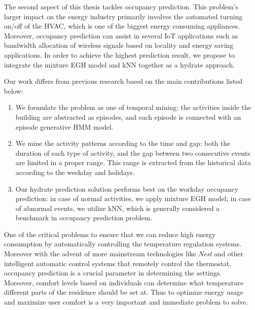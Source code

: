 The second aspect of this thesis tackles occupancy prediction. This problem's larger impact on the energy industry primarily involves the automated turning on/off of the HVAC, which is one of the biggest energy consuming appliances. Moreover, occupancy prediction can assist in several IoT applications such as bandwidth allocation of wireless signals based on locality and energy saving applications.
In order to achieve the highest prediction result, 
we propose to integrate the mixture EGH model and 
kNN together as a hydrate approach.

Our work differs from previous research based on the main contributions listed below:
\begin{enumerate}
\item We formulate the problem as one of temporal mining: the activities inside the building are abstracted as episodes, and each episode is connected with an episode generative HMM model.
\item We mine the activity patterns according to the time and gap: both the duration of each type of 
activity, and the gap between two consecutive events are limited in a proper range. 
This range is extracted from the historical data according to the weekday and holidays.
\item Our hydrate prediction solution performs best on the workday occupancy prediction: 
in case of normal activities, we apply mixture EGH model; 
in case of abnormal events, we utilize kNN,  
which is generally considered a benchmark in occupancy prediction problem. 
\end{enumerate}

One of the critical problems to ensure that we can reduce high energy consumption by automatically controlling the temperature regulation systems. Moreover with the advent of more mainstream technologies like \emph{Nest} and other intelligent automatic control systems that remotely control the thermostat, occupancy prediction is a crucial parameter in determining the settings. Moreover, comfort levels based on individuals can determine what temperature different parts of the residence should be set at. Thus to optimize energy usage and maximize user comfort is a very important and immediate problem to solve.


